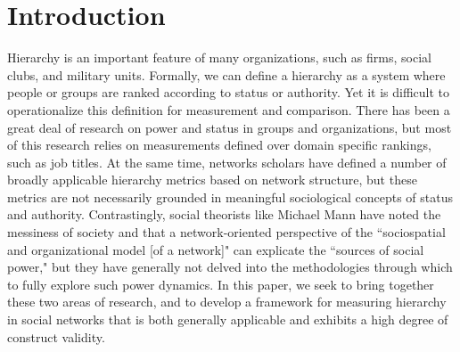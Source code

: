 \documentclass[3p,times]{elsarticle}
\begin{document}
\section{Introduction}
\label{sec:introduction}

Hierarchy is an important feature of many organizations, such as firms, social clubs, and military units. Formally, we can define a hierarchy as a system where people or groups are ranked according to status or authority. Yet it is difficult to operationalize this definition for measurement and comparison. There has been a great deal of research on power and status in groups and organizations, but most of this research relies on measurements defined over domain specific rankings, such as job titles. At the same time, networks scholars have defined a number of broadly applicable hierarchy metrics based on network structure, but these metrics are not necessarily grounded in meaningful sociological concepts of status and authority. Contrastingly, social theorists like Michael Mann have noted the messiness of society and that a network-oriented perspective of the ``sociospatial and organizational model [of a network]" can explicate the ``sources of social power," \cite{mann} but they have generally not delved into the methodologies through which to fully explore such power dynamics. In this paper, we seek to bring together these two areas of research, and to develop a framework for measuring hierarchy in social networks that is both generally applicable and exhibits a high degree of construct validity.


\end{document}
